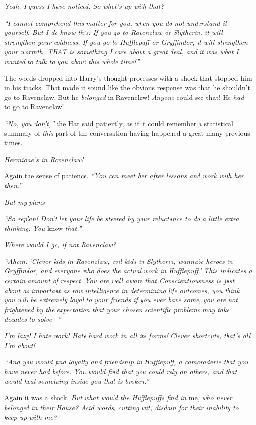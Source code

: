 \emph{Yeah. I guess I have noticed. So what's up with that?}

\emph{``I cannot comprehend this matter for you, when you do not understand it yourself. But I do know this: If you go to Ravenclaw or Slytherin, it will strengthen your coldness. If you go to Hufflepuff or Gryffindor, it will strengthen your warmth. THAT is something I care about a great deal, and it was what I wanted to talk to you about this whole time!''}

The words dropped into Harry's thought processes with a shock that stopped him in his tracks. That made it sound like the obvious response was that he shouldn't go to Ravenclaw. But he \emph{belonged} in Ravenclaw! \emph{Anyone} could see that! He \emph{had} to go to Ravenclaw!

\emph{``No, you don't,''} the Hat said patiently, as if it could remember a statistical summary of \emph{this} part of the conversation having happened a great many previous times.

\emph{Hermione's in Ravenclaw!}

Again the sense of patience. \emph{``You can meet her after lessons and work with her then.''}

\emph{But my plans -}

\emph{``So replan! Don't let your life be steered by your reluctance to do a little extra thinking. You} know \emph{that.''}

\emph{Where would I go, if not Ravenclaw?}

\emph{``Ahem. `Clever kids in Ravenclaw, evil kids in Slytherin, wannabe heroes in Gryffindor, and everyone who does the actual work in Hufflepuff.' This indicates a certain amount of respect. You are well aware that Conscientiousness is just about as important as raw intelligence in determining life outcomes, you think you will be extremely loyal to your friends if you ever have some, you are not frightened by the expectation that your chosen scientific problems may take decades to solve~-''}

\emph{I'm lazy! I hate work! Hate hard work in all its forms! Clever shortcuts, that's all I'm about!}

\emph{``And you would find loyalty and friendship in Hufflepuff, a camaraderie that you have never had before. You would find that you could rely on others, and that would heal something inside you that is broken.''}

Again it was a shock. \emph{But what would the Hufflepuffs find in} me\emph{, who never belonged in their House? Acid words, cutting wit, disdain for their inability to keep up with me?}

